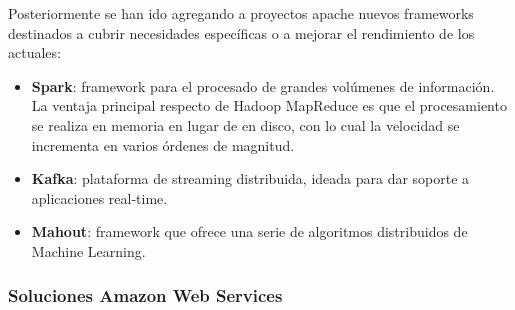 Posteriormente se han ido agregando a proyectos apache nuevos frameworks
destinados a cubrir necesidades específicas o a mejorar el rendimiento de los
actuales:

\begin{itemize}
\item \textbf{Spark}: framework para el procesado de grandes volúmenes de
  información. La ventaja principal respecto de Hadoop MapReduce es que el
  procesamiento se realiza en memoria en lugar de en disco, con lo cual la
  velocidad se incrementa en varios órdenes de magnitud. 
\item \textbf{Kafka}: plataforma de streaming distribuida, ideada para dar
  soporte a aplicaciones real-time. 
\item \textbf{Mahout}: framework que ofrece una serie de algoritmos distribuidos
  de Machine Learning. 
\end{itemize}

\subsubsection{Soluciones Amazon Web Services}
\label{sec:eco-aws}
